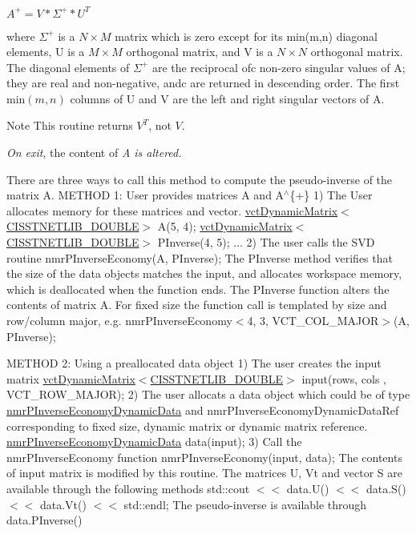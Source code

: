 $ A^{+} = V * \Sigma^{+} * U^{T} $

where $ \Sigma^{+} $ is a $ N \times M $ matrix which is zero except for its min(m,n) diagonal elements, U is a $ M \times M $ orthogonal matrix, and V is a $ N \times N $ orthogonal matrix. The diagonal elements of $ \Sigma^{+} $ are the reciprocal ofc non-\/zero singular values of A; they are real and non-\/negative, andc are returned in descending order. The first $ \mbox{min}(m,n) $ columns of U and V are the left and right singular vectors of A.

\begin{DoxyNote}{Note}
This routine returns $ V^{T} $, not $ V $. 

{\itshape On exit}, the content of {\itshape A is altered.}
\end{DoxyNote}
There are three ways to call this method to compute the pseudo-\/inverse of the matrix A. M\-E\-T\-H\-O\-D 1\-: User provides matrices A and A$^\wedge$\{+\} 1) The User allocates memory for these matrices and vector. \hyperlink{classvct_dynamic_matrix}{vct\-Dynamic\-Matrix$<$\-C\-I\-S\-S\-T\-N\-E\-T\-L\-I\-B\-\_\-\-D\-O\-U\-B\-L\-E$>$} A(5, 4); \hyperlink{classvct_dynamic_matrix}{vct\-Dynamic\-Matrix$<$\-C\-I\-S\-S\-T\-N\-E\-T\-L\-I\-B\-\_\-\-D\-O\-U\-B\-L\-E$>$} P\-Inverse(4, 5); ... 2) The user calls the S\-V\-D routine nmr\-P\-Inverse\-Economy(\-A, P\-Inverse); The P\-Inverse method verifies that the size of the data objects matches the input, and allocates workspace memory, which is deallocated when the function ends. The P\-Inverse function alters the contents of matrix A. For fixed size the function call is templated by size and row/column major, e.\-g. nmr\-P\-Inverse\-Economy$<$4, 3, V\-C\-T\-\_\-\-C\-O\-L\-\_\-\-M\-A\-J\-O\-R$>$(\-A, P\-Inverse);

M\-E\-T\-H\-O\-D 2\-: Using a preallocated data object 1) The user creates the input matrix \hyperlink{classvct_dynamic_matrix}{vct\-Dynamic\-Matrix$<$\-C\-I\-S\-S\-T\-N\-E\-T\-L\-I\-B\-\_\-\-D\-O\-U\-B\-L\-E$>$} input(rows, cols , V\-C\-T\-\_\-\-R\-O\-W\-\_\-\-M\-A\-J\-O\-R); 2) The user allocats a data object which could be of type \hyperlink{classnmr_p_inverse_economy_dynamic_data}{nmr\-P\-Inverse\-Economy\-Dynamic\-Data} and nmr\-P\-Inverse\-Economy\-Dynamic\-Data\-Ref corresponding to fixed size, dynamic matrix or dynamic matrix reference. \hyperlink{classnmr_p_inverse_economy_dynamic_data}{nmr\-P\-Inverse\-Economy\-Dynamic\-Data} data(input); 3) Call the nmr\-P\-Inverse\-Economy function nmr\-P\-Inverse\-Economy(input, data); The contents of input matrix is modified by this routine. The matrices U, Vt and vector S are available through the following methods std\-::cout $<$$<$ data.\-U() $<$$<$ data.\-S() $<$$<$ data.\-Vt() $<$$<$ std\-::endl; The pseudo-\/inverse is available through data.\-P\-Inverse()

